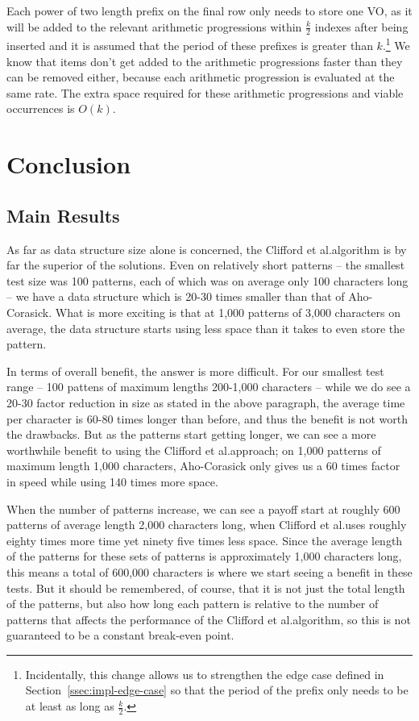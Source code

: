 \documentclass[ %
                    author={Dominic Joseph Moylett},
                    degree={MEng},
                     title={Dictionary Matching with Fingerprints},
                  subtitle={An Empirical Analysis},
                      type={research},
                      year={2015} ]{dissertation}
\begin{document}
Each power of two length prefix on the final row only needs to store one VO, as it will be added to the relevant arithmetic progressions within $\frac{k}{2}$ indexes after being inserted and it is assumed that the period of these prefixes is greater than $k$.\footnote{Incidentally, this change allows us to strengthen the edge case defined in Section~\ref{ssec:impl-edge-case} so that the period of the prefix only needs to be at least as long as $\frac{k}{2}$.} We know that items don't get added to the arithmetic progressions faster than they can be removed either, because each arithmetic progression is evaluated at the same rate. The extra space required for these arithmetic progressions and viable occurrences is $O(k)$.


\chapter{Conclusion}
\label{chap:conclusion}

\section{Main Results}

As far as data structure size alone is concerned, the Clifford et al.\@ algorithm is by far the superior of the solutions. Even on relatively short patterns -- the smallest test size was 100 patterns, each of which was on average only 100 characters long -- we have a data structure which is 20-30 times smaller than that of Aho-Corasick. What is more exciting is that at 1,000 patterns of 3,000 characters on average, the data structure starts using less space than it takes to even store the pattern.

In terms of overall benefit, the answer is more difficult. For our smallest test range -- 100 pattens of maximum lengths 200-1,000 characters -- while we do see a 20-30 factor reduction in size as stated in the above paragraph, the average time per character is 60-80 times longer than before, and thus the benefit is not worth the drawbacks. But as the patterns start getting longer, we can see a more worthwhile benefit to using the Clifford et al.\@ approach; on 1,000 patterns of maximum length 1,000 characters, Aho-Corasick only gives us a 60 times factor in speed while using 140 times more space.

When the number of patterns increase, we can see a payoff start at roughly 600 patterns of average length 2,000 characters long, when Clifford et al.\@ uses roughly eighty times more time yet ninety five times less space. Since the average length of the patterns for these sets of patterns is approximately 1,000 characters long, this means a total of 600,000 characters is where we start seeing a benefit in these tests. But it should be remembered, of course, that it is not just the total length of the patterns, but also how long each pattern is relative to the number of patterns that affects the performance of the Clifford et al.\@ algorithm, so this is not guaranteed to be a constant break-even point.
\end{document}
